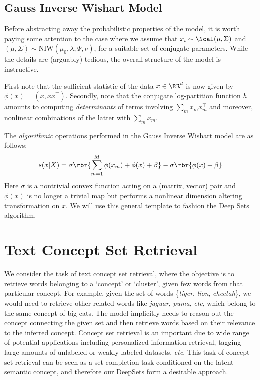 \documentclass{article}
\newcommand{\latinphrase}[1]{\emph{#1}}    %
\newcommand{\etc}{\latinphrase{etc}\xspace}
\newcommand{\deepsets}{DeepSets\xspace}
\begin{document}
\subsection{Gauss Inverse Wishart Model}
Before abstracting away the probabilistic properties of the model, it is worth paying some attention to the case where we assume that $x_i \sim \Ncal(\mu, \Sigma)$ and $(\mu, \Sigma) \sim \mathrm{NIW}(\mu_0, \lambda, \Psi, \nu)$, for a suitable set of conjugate parameters. While the details are (arguably) tedious, the overall structure of the model is instructive.

First note that the sufficient statistic of the data $x \in \RR^d$ is now given by $\phi(x) = (x, x x^\top)$. Secondly, note that the conjugate log-partition function $h$ amounts to computing \emph{determinants} of terms involving $\sum_m x_m x_m^\top$ and moreover, nonlinear combinations of the latter with $\sum_m x_m$. 

The \emph{algorithmic} operations performed in the Gauss Inverse Wishart model are as follows:
\begin{align}
  \label{eq:nutshell-gw}
  s(x|X) = \sigma\rbr{\sum_{m=1}^M \phi(x_m) + \phi(x) + \beta} - 
  \sigma\rbr{\phi(x) + \beta}
\end{align}
Here $\sigma$ is a nontrivial convex function acting on a (matrix, vector) pair and $\phi(x)$ is no longer a trivial map but performs a nonlinear dimension altering transformation on $x$. We will use this general template to fashion the Deep Sets algorithm. 


\newpage
\section{Text Concept Set Retrieval}
\label{app:lda-model-details}

We consider the task of text concept set retrieval, where the objective is to retrieve words belonging to a `concept' or `cluster', given few words from that particular concept. For example, given the set of words \{\emph{tiger}, \emph{lion}, \emph{cheetah}\}, we would need to retrieve other related words like \emph{jaguar}, \emph{puma}, \etc, which belong to the same concept of big cats. The model implicitly needs to reason out the concept connecting the given set and then retrieve words based on their relevance to the inferred concept. Concept set retrieval is an important due to wide range of potential applications including personalized information retrieval, tagging large amounts of unlabeled or weakly labeled datasets, \etc. This task of concept set retrieval can be seen as a set completion task conditioned on the latent semantic concept, and therefore our \deepsets form a desirable approach.
\end{document}
